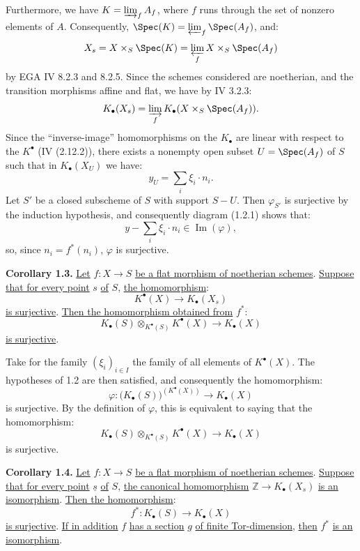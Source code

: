 %
Furthermore,
we have $K=\varinjlim_f A_f$, where $f$ runs through the set of nonzero elements of $A$. Consequently, $\Spec(K)=\varprojlim_f\Spec(A_f)$, and:
\[
X_s=X\times_S\Spec(K)=\varprojlim_f X\times_S\Spec(A_f)
\]
by EGA IV 8.2.3 and 8.2.5. Since the schemes considered are noetherian, and the transition morphisms affine and flat, we have by IV 3.2.3:
\[
K_\bullet(X_s)=\varinjlim_f K_\bullet(X\times_S\Spec(A_f)).
\]
Since the ``inverse-image'' homomorphisms on the $K_\bullet$ are linear with respect to the $K^{\bullet}$ (IV (2.12.2)), there exists a nonempty open subset $U=\Spec(A_f)$ of $S$ such that in $K_\bullet(X_U)$ we have:
\[
y_U=\sum_i\xi_i\cdot n_i.
\]
Let $S'$ be a closed subscheme of $S$ with support $S-U$. Then $\varphi_{S'}$ is surjective by the induction hypothesis, and consequently diagram (1.2.1) shows that:
\[
y-\sum_i\xi_i\cdot n_i\in \operatorname{Im}(\varphi),
\]
so, since $n_i=f^*(n_i)$, $\varphi$ is surjective.

\textbf{Corollary 1.3.} \uline{Let} $f:X\to S$ \uline{be a flat morphism of noetherian schemes}. \uline{Suppose that for every point} $s$ \uline{of} $S$, \uline{the homomorphism}:
\[
K^{\bullet}(X)\longrightarrow K_\bullet(X_s)
\]
\uline{is surjective}. \uline{Then the homomorphism obtained from} $f^*$:
\[
K_\bullet(S)\otimes_{K^{\bullet}(S)}K^{\bullet}(X)\longrightarrow K_\bullet(X)
\]
\uline{is surjective}.

%
Take
for the family $(\xi_i)_{i\in I}$ the family of all elements of $K^{\bullet}(X)$. The hypotheses of 1.2 are then satisfied, and consequently the homomorphism:
\[
\varphi:\bigl(K_\bullet(S)\bigr)^{(K^{\bullet}(X))}\longrightarrow K_\bullet(X)
\]
is surjective. By the definition of $\varphi$, this is equivalent to saying that the homomorphism:
\[
K_\bullet(S)\otimes_{K^{\bullet}(S)}K^{\bullet}(X)\longrightarrow K_\bullet(X)
\]
is surjective.

\textbf{Corollary 1.4.} \uline{Let} $f:X\to S$ \uline{be a flat morphism of noetherian schemes}. \uline{Suppose that for every point} $\underline{s}$ \uline{of} $S$, \uline{the canonical homomorphism} $\mathbb Z\to K_\bullet(X_s)$ \uline{is an isomorphism}. \uline{Then the homomorphism}:
\[
f^*:K_\bullet(S)\longrightarrow K_\bullet(X)
\]
\uline{is surjective}. \uline{If in addition} $f$ \uline{has a section} $g$ \uline{of finite Tor-dimension}, \uline{then} $f^*$ \uline{is an isomorphism}.

